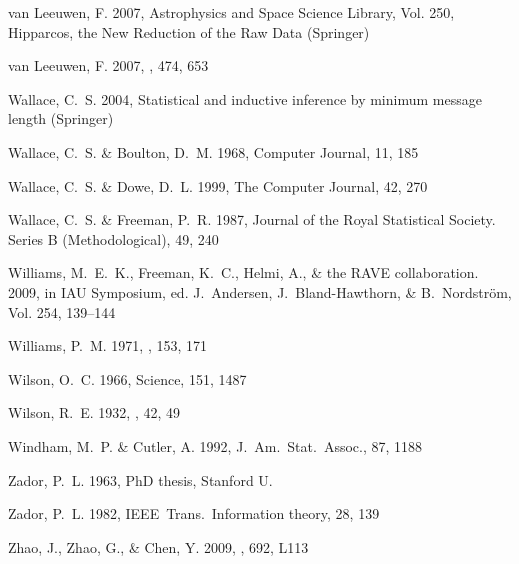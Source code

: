 \begin{thebibliography}{99}
{van Leeuwen}, F. 2007{}, Astrophysics and Space Science Library,
  Vol. 250, {Hipparcos, the New Reduction of the Raw Data} ({Springer})

{van Leeuwen}, F. 2007{}, \aap, 474, 653

{Wallace}, C.~S. 2004, {Statistical and inductive inference by minimum message
  length} ({Springer})

{Wallace}, C.~S. \& {Boulton}, D.~M. 1968, {Computer Journal}, 11, 185

{Wallace}, C.~S. \& {Dowe}, D.~L. 1999, {The Computer Journal}, 42, 270

{Wallace}, C.~S. \& {Freeman}, P.~R. 1987, Journal of the Royal Statistical
  Society. Series B (Methodological), 49, 240

{Williams}, M.~E.~K., {Freeman}, K.~C., {Helmi}, A., \& {the RAVE
  collaboration}. 2009, in IAU Symposium, ed. J.~{Andersen},
  J.~{Bland-Hawthorn}, \& B.~{Nordstr{\"o}m}, Vol. 254, 139--144

{Williams}, P.~M. 1971, \mnras, 153, 171

{Wilson}, O.~C. 1966, Science, 151, 1487

{Wilson}, R.~E. 1932, \aj, 42, 49

{Windham}, M.~P. \& {Cutler}, A. 1992, {J.~Am.~Stat.~Assoc.}, 87, 1188

{Zador}, P.~L. 1963, PhD thesis, Stanford U.

{Zador}, P.~L. 1982, {IEEE~Trans.~Information theory}, 28, 139

{Zhao}, J., {Zhao}, G., \& {Chen}, Y. 2009, \apjl, 692, L113


\end{thebibliography}
